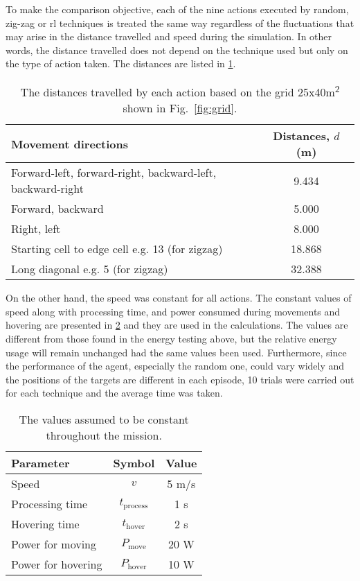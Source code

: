 \documentclass[../main.tex]{subfiles}
\begin{document}
To make the comparison objective, 
each of the nine actions executed by random, zig-zag
or \gls{rl} techniques is treated the same way regardless 
of the fluctuations that may arise in the 
distance travelled and speed during
the simulation.
In other words, the distance travelled does not depend
on the technique used but only 
on the type of action taken. 
The distances are listed in \cref{tab:distances}.

\begin{table}[bp]
\caption{The distances travelled by each action based on
    the grid 25x40m\textsuperscript{2} shown in 
    Fig.~\ref{fig:grid}.}
\label{tab:distances}
\centering
\begin{tabular}{p{3.4in} c}
\toprule
Movement directions & Distances, $d$ (m) \\
\midrule
\raggedright Forward-left, forward-right, 
backward-left, backward-right & 9.434 \\
Forward, backward & 5.000 \\
Right, left & 8.000 \\
Starting cell to edge cell e.g. 13\textrightarrow 1 (for zigzag) & 18.868 \\
\raggedright Long diagonal e.g. 5\textrightarrow 6 (for zigzag) & 32.388 \\
\bottomrule
\end{tabular}
\end{table}

On the other hand, the speed was constant for all actions. 
The constant values of speed along with processing time,
and power consumed during movements and hovering
are presented
in \cref{tab:assumptions}
and they are used in the calculations.
The values are different from those found in the energy testing above,
but the relative energy usage will remain unchanged had the same
values been used.
Furthermore, since the performance of the agent,
especially the random one, could vary widely and
the positions of the targets are different in each episode, 
10 trials were carried out for each technique and
the average time was taken.

\begin{table}[tbp]
\caption{The values assumed to be constant throughout the
mission.}
\label{tab:assumptions}
\centering
\begin{tabular}{l c c}
\toprule
Parameter & Symbol & Value \\
\midrule
Speed & $v$ & 5 m/s \\
Processing time & $t_{\text{process}}$ & 1 s \\
Hovering time & $t_{\text{hover}}$ & 2 s \\
Power for moving & $P_{\text{move}}$ & 20 W \\
Power for hovering & $P_{\text{hover}}$ & 10 W \\
\bottomrule
\end{tabular}
\end{table}
\end{document}
